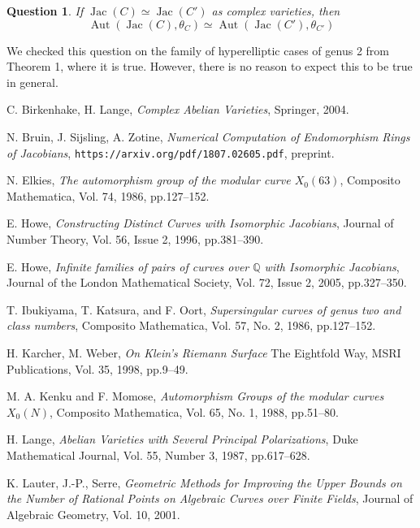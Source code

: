 \documentclass[12pt,reqno]{amsart}
\DeclareMathOperator{\Aut}{Aut}
\DeclareMathOperator{\Jac}{Jac}
\newcommand{\Q}{\mathbb{Q}}
\newcommand{\mc}{\mathcal}
\newtheorem*{question}{Question}
\theoremstyle{definition}
\theoremstyle{remark}
\begin{document}

\begin{question} If $\Jac(C) \simeq \Jac(C')$ as complex varieties, then $$\Aut(\Jac(C), \theta_C) \simeq \Aut(\Jac(C'), \theta_{C'})$$  \end{question} 

We checked this question on the family of hyperelliptic cases of genus 2 from \cite{howe1} Theorem 1, where it is true. However, there is no reason to expect this to be true in general. 



C. Birkenhake, H. Lange, 
\textit{Complex Abelian Varieties},
Springer, 2004.

N. Bruin, J. Sijsling, A. Zotine,
\textit{Numerical Computation of Endomorphism Rings of Jacobians},
\texttt{https://arxiv.org/pdf/1807.02605.pdf}, preprint.

N. Elkies,
\textit{The automorphism group of the modular curve $X_0(63)$},
Composito Mathematica,
Vol. 74, 1986, pp.127--152.

E. Howe,
\textit{Constructing Distinct Curves with Isomorphic Jacobians},
Journal of Number Theory,
Vol. 56, Issue 2, 1996, pp.381--390.

E. Howe,
\textit{Infinite families of pairs of curves over $\Q$ with Isomorphic Jacobians},
Journal of the London Mathematical Society,
Vol. 72, Issue 2, 2005, pp.327--350.

T. Ibukiyama, T. Katsura, and F. Oort,
\textit{Supersingular curves of genus two and class numbers},
Composito Mathematica,
Vol. 57, No. 2, 1986, pp.127--152.

H. Karcher, M. Weber,
\textit{On Klein's Riemann Surface}
The Eightfold Way, MSRI Publications, 
Vol. 35, 1998, pp.9--49.

M. A. Kenku and F. Momose,
\textit{Automorphism Groups of the modular curves $X_0(N)$},
Composito Mathematica,
Vol. 65, No. 1, 1988, pp.51--80.


H. Lange,
\textit{Abelian Varieties with Several Principal Polarizations},
Duke Mathematical Journal,
Vol. 55, Number 3, 1987, pp.617--628.


K. Lauter, J.-P., Serre, 
\textit{Geometric Methods for Improving the Upper Bounds on the Number of Rational Points on Algebraic Curves over Finite Fields}, 
Journal of Algebraic Geometry,
Vol. 10, 2001.
\end{document}
